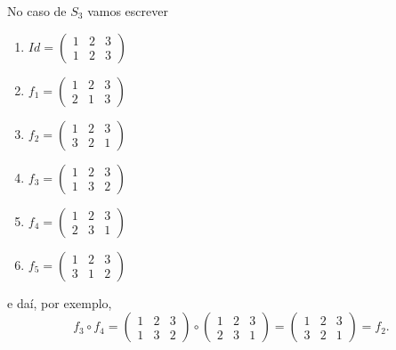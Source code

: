 No caso de $S_3$ vamos escrever
\begin{multicols}{3}
    \begin{enumerate}
        \item[] $Id = \begin{pmatrix}
            1 & 2 & 3\\
            1 & 2 & 3
        \end{pmatrix}$
        \item[] $f_1 = \begin{pmatrix}
            1 & 2 & 3\\
            2 & 1 & 3
        \end{pmatrix}$
        \item[] $f_2 = \begin{pmatrix}
            1 & 2 & 3\\
            3 & 2 & 1
        \end{pmatrix}$
        \item[] $f_3 = \begin{pmatrix}
            1 & 2 & 3\\
            1 & 3 & 2
        \end{pmatrix}$
        \item[] $f_4 = \begin{pmatrix}
            1 & 2 & 3\\
            2 & 3 & 1
        \end{pmatrix}$
        \item[] $f_5 = \begin{pmatrix}
            1 & 2 & 3\\
            3 & 1 & 2
        \end{pmatrix}$
    \end{enumerate}
\end{multicols}
e daí, por exemplo,
\[
    f_3\circ f_4 = \begin{pmatrix}
            1 & 2 & 3\\
            1 & 3 & 2
        \end{pmatrix} \circ \begin{pmatrix}
            1 & 2 & 3\\
            2 & 3 & 1
        \end{pmatrix} = \begin{pmatrix}
            1 & 2 & 3\\
            3 & 2 & 1
        \end{pmatrix} = f_2.
\]



